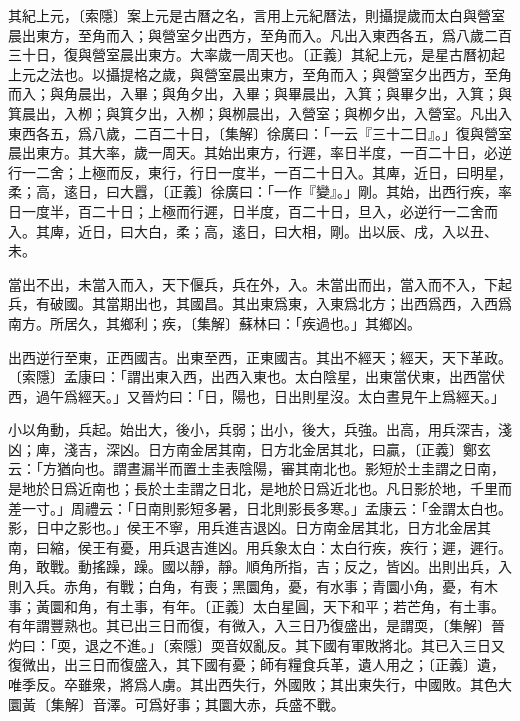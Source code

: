 其紀上元，〔索隱〕案上元是古曆之名，言用上元紀曆法，則攝提歲而太白與營室晨出東方，至角而入；與營室夕出西方，至角而入。凡出入東西各五，爲八歲二百三十日，復與營室晨出東方。大率歲一周天也。〔正義〕其紀上元，是星古曆初起上元之法也。以攝提格之歲，與營室晨出東方，至角而入；與營室夕出西方，至角而入；與角晨出，入畢；與角夕出，入畢；與畢晨出，入箕；與畢夕出，入箕；與箕晨出，入栁；與箕夕出，入栁；與栁晨出，入營室；與栁夕出，入營室。凡出入東西各五，爲八歲，二百二十日，〔集解〕徐廣曰：「一云『三十二日』。」復與營室晨出東方。其大率，歲一周天。其始出東方，行遲，率日半度，一百二十日，必逆行一二舍；上極而反，東行，行日一度半，一百二十日入。其庳，近日，曰明星，柔；高，逺日，曰大囂，〔正義〕徐廣曰：「一作『變』。」剛。其始，出西行疾，率日一度半，百二十日；上極而行遲，日半度，百二十日，旦入，必逆行一二舍而入。其庳，近日，曰大白，柔；高，逺日，曰大相，剛。出以辰、戌，入以丑、未。

當出不出，未當入而入，天下偃兵，兵在外，入。未當出而出，當入而不入，下起兵，有破國。其當期出也，其國昌。其出東爲東，入東爲北方；出西爲西，入西爲南方。所居久，其鄉利；疾，〔集解〕蘇林曰：「疾過也。」其鄉凶。

出西逆行至東，正西國吉。出東至西，正東國吉。其出不經天；經天，天下革政。〔索隱〕孟康曰：「謂出東入西，出西入東也。太白陰星，出東當伏東，出西當伏西，過午爲經天。」又晉灼曰：「日，陽也，日出則星沒。太白晝見午上爲經天。」

小以角動，兵起。始出大，後小，兵弱；出小，後大，兵強。出高，用兵深吉，淺凶；庳，淺吉，深凶。日方南金居其南，日方北金居其北，曰贏，〔正義〕鄭玄云：「方猶向也。謂晝漏半而置土圭表陰陽，審其南北也。影短於土圭謂之日南，是地於日爲近南也；長於土圭謂之日北，是地於日爲近北也。凡日影於地，千里而差一寸。」周禮云：「日南則影短多暑，日北則影長多寒。」孟康云：「金謂太白也。影，日中之影也。」侯王不寧，用兵進吉退凶。日方南金居其北，日方北金居其南，曰縮，侯王有憂，用兵退吉進凶。用兵象太白：太白行疾，疾行；遲，遲行。角，敢戰。動搖躁，躁。國以靜，靜。順角所指，吉；反之，皆凶。出則出兵，入則入兵。赤角，有戰；白角，有喪；黑圜角，憂，有水事；青圜小角，憂，有木事；黃圜和角，有土事，有年。〔正義〕太白星圓，天下和平；若芒角，有土事。有年謂豐熟也。其已出三日而復，有微入，入三日乃復盛出，是謂耎，〔集解〕晉灼曰：「耎，退之不進。」〔索隱〕耎音奴亂反。其下國有軍敗將北。其已入三日又復微出，出三日而復盛入，其下國有憂；師有糧食兵革，遺人用之；〔正義〕遺，唯季反。卒雖衆，將爲人虜。其出西失行，外國敗；其出東失行，中國敗。其色大圜黃󸽒，〔集解〕音澤。可爲好事；其圜大赤，兵盛不戰。


